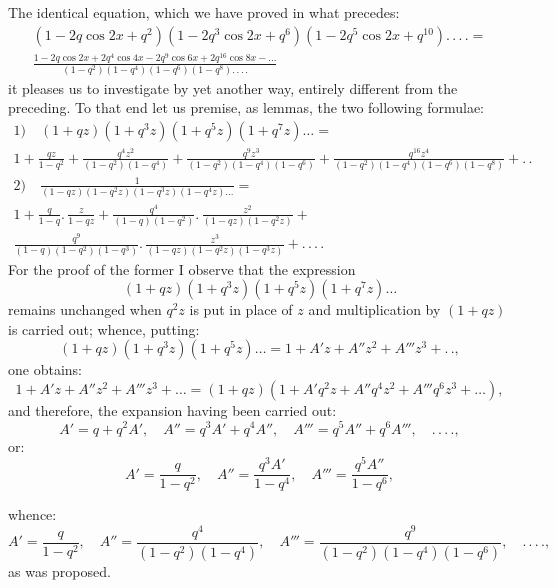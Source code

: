 \documentclass{article}
\begin{document}
The identical equation, which we have proved in what precedes:
\[
\begin{gathered}
(1-2q\cos 2x+q^{2})(1-2q^{3}\cos 2x+q^{6})(1-2q^{5}\cos 2x+q^{10}).\,.\,.\,.=\\[1.5ex]
\frac{1-2q\cos 2x+2q^{4}\cos 4x-2q^{9}\cos 6x+2q^{16}\cos 8x-\ldots}{(1-q^{2})(1-q^{4})(1-q^{6})(1-q^{8}).\,.\,.\,.}
\end{gathered}
\]
it pleases us to investigate by yet another way, entirely different from the preceding. To that end let us premise, as lemmas, the two following formulae:
\[
\begin{gathered}
\text{1)}\quad(1+qz)(1+q^{3}z)(1+q^{5}z)(1+q^{7}z)\ldots=\\[1.5ex]
1+\frac{qz}{1-q^{2}}+\frac{q^{4}z^{2}}{(1-q^{2})(1-q^{4})}+\frac{q^{9}z^{3}}{(1-q^{2})(1-q^{4})(1-q^{6})}+\frac{q^{16}z^{4}}{(1-q^{2})(1-q^{4})(1-q^{6})(1-q^{8})}+.\,.\\[2ex]
\text{2)}\quad\frac{1}{(1-qz)(1-q^{2}z)(1-q^{3}z)(1-q^{4}z)\ldots}=\\[1.5ex]
1+\frac{q}{1-q}.\,\frac{z}{1-qz}+\frac{q^{4}}{(1-q)(1-q^{2})}.\,\frac{z^{2}}{(1-qz)(1-q^{2}z)}+\\[1.5ex]
\frac{q^{9}}{(1-q)(1-q^{2})(1-q^{3})}.\,\frac{z^{3}}{(1-qz)(1-q^{2}z)(1-q^{3}z)}+.\,.\,.\,.
\end{gathered}
\]
For the proof of the former I observe that the expression
\[
(1+qz)(1+q^{3}z)(1+q^{5}z)(1+q^{7}z)\ldots
\]
remains unchanged when $q^{2}z$ is put in place of $z$ and multiplication by $(1+qz)$ is carried out; whence, putting:
\[
(1+qz)(1+q^{3}z)(1+q^{5}z)\ldots=1+A'z+A''z^{2}+A'''z^{3}+.\,.,
\]
one obtains:
\[
1+A'z+A''z^{2}+A'''z^{3}+\ldots=(1+qz)(1+A'q^{2}z+A''q^{4}z^{2}+A'''q^{6}z^{3}+\ldots),
\]
and therefore, the expansion having been carried out:
\[
A'=q+q^{2}A',\quad A''=q^{3}A'+q^{4}A'',\quad A'''=q^{5}A''+q^{6}A''',\quad.\,.\,.\,.,
\]
or:
\[
A'=\frac{q}{1-q^{2}},\quad A''=\frac{q^{3}A'}{1-q^{4}},\quad A'''=\frac{q^{5}A''}{1-q^{6}},
\]

whence:
\[
A'=\frac{q}{1-q^{2}},\quad A''=\frac{q^{4}}{(1-q^{2})(1-q^{4})},\quad A'''=\frac{q^{9}}{(1-q^{2})(1-q^{4})(1-q^{6})},\quad.\,.\,.\,.,
\]
as was proposed.
\end{document}
